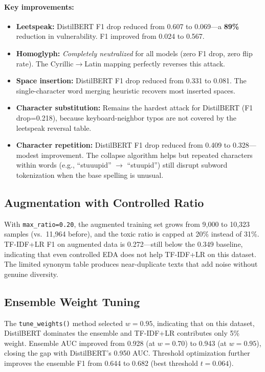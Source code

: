 \documentclass[11pt,a4paper]{article}
\begin{document}
\paragraph{Key improvements:}
\begin{itemize}[nosep]
  \item \textbf{Leetspeak:} DistilBERT F1 drop reduced from 0.607 to 0.069---a \textbf{89\%} reduction in vulnerability. F1 improved from 0.024 to 0.567.
  \item \textbf{Homoglyph:} \emph{Completely neutralized} for all models (zero F1 drop, zero flip rate). The Cyrillic$\to$Latin mapping perfectly reverses this attack.
  \item \textbf{Space insertion:} DistilBERT F1 drop reduced from 0.331 to 0.081. The single-character word merging heuristic recovers most inserted spaces.
  \item \textbf{Character substitution:} Remains the hardest attack for DistilBERT (F1 drop=0.218), because keyboard-neighbor typos are not covered by the leetspeak reversal table.
  \item \textbf{Character repetition:} DistilBERT F1 drop reduced from 0.409 to 0.328---modest improvement. The collapse algorithm helps but repeated characters within words (e.g., ``stuuupid'' $\to$ ``stuupid'') still disrupt subword tokenization when the base spelling is unusual.
\end{itemize}

\subsection{Augmentation with Controlled Ratio}

With \texttt{max\_ratio=0.20}, the augmented training set grows from 9,000 to 10,323 samples (vs.\ 11,964 before), and the toxic ratio is capped at 20\% instead of 31\%.
TF-IDF+LR F1 on augmented data is 0.272---still below the 0.349 baseline, indicating that even controlled EDA does not help TF-IDF+LR on this dataset.
The limited synonym table produces near-duplicate texts that add noise without genuine diversity.

\subsection{Ensemble Weight Tuning}

The \texttt{tune\_weights()} method selected $w=0.95$, indicating that on this dataset, DistilBERT dominates the ensemble and TF-IDF+LR contributes only 5\% weight.
Ensemble AUC improved from 0.928 (at $w=0.70$) to 0.943 (at $w=0.95$), closing the gap with DistilBERT's 0.950 AUC.
Threshold optimization further improves the ensemble F1 from 0.644 to 0.682 (best threshold $t=0.064$).
\end{document}
